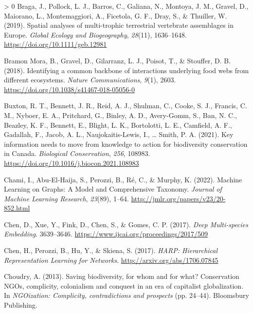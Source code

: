 \documentclass[10pt,oneside]{article}
\newlength{\cslhangindent}
\newenvironment{CSLReferences}[3] %
 {%
  \setlength{\parindent}{0pt}
  \ifodd #1 \everypar{\setlength{\hangindent}{\cslhangindent}}\ignorespaces\fi
  \ifnum #2 > 0
  \setlength{\parskip}{#2\baselineskip}
  \fi
 }%
 {}
\begin{document}
\begin{CSLReferences}{1}{0}
\leavevmode\hypertarget{ref-Braga2019SpaAna}{}%
Braga, J., Pollock, L. J., Barros, C., Galiana, N., Montoya, J. M.,
Gravel, D., Maiorano, L., Montemaggiori, A., Ficetola, G. F., Dray, S.,
\& Thuiller, W. (2019). Spatial analyses of multi-trophic terrestrial
vertebrate assemblages in Europe. \emph{Global Ecology and
Biogeography}, \emph{28}(11), 1636--1648.
\url{https://doi.org/10.1111/geb.12981}

\leavevmode\hypertarget{ref-BramonMora2018IdeCom}{}%
Bramon Mora, B., Gravel, D., Gilarranz, L. J., Poisot, T., \& Stouffer,
D. B. (2018). Identifying a common backbone of interactions underlying
food webs from different ecosystems. \emph{Nature Communications},
\emph{9}(1), 2603. \url{https://doi.org/10.1038/s41467-018-05056-0}

\leavevmode\hypertarget{ref-Buxton2021KeyInf}{}%
Buxton, R. T., Bennett, J. R., Reid, A. J., Shulman, C., Cooke, S. J.,
Francis, C. M., Nyboer, E. A., Pritchard, G., Binley, A. D., Avery-Gomm,
S., Ban, N. C., Beazley, K. F., Bennett, E., Blight, L. K., Bortolotti,
L. E., Camfield, A. F., Gadallah, F., Jacob, A. L., Naujokaitis-Lewis,
I., \ldots{} Smith, P. A. (2021). Key information needs to move from
knowledge to action for biodiversity conservation in Canada.
\emph{Biological Conservation}, \emph{256}, 108983.
\url{https://doi.org/10.1016/j.biocon.2021.108983}

\leavevmode\hypertarget{ref-Chami2022MacLea}{}%
Chami, I., Abu-El-Haija, S., Perozzi, B., Ré, C., \& Murphy, K. (2022).
Machine Learning on Graphs: A Model and Comprehensive Taxonomy.
\emph{Journal of Machine Learning Research}, \emph{23}(89), 1--64.
\url{http://jmlr.org/papers/v23/20-852.html}

\leavevmode\hypertarget{ref-Chen2017DeeMul}{}%
Chen, D., Xue, Y., Fink, D., Chen, S., \& Gomes, C. P. (2017).
\emph{Deep Multi-species Embedding}. 3639--3646.
\url{https://www.ijcai.org/proceedings/2017/509}

\leavevmode\hypertarget{ref-Chen2017HarHie}{}%
Chen, H., Perozzi, B., Hu, Y., \& Skiena, S. (2017). \emph{HARP:
Hierarchical Representation Learning for Networks}.
\url{http://arxiv.org/abs/1706.07845}

\leavevmode\hypertarget{ref-Choudry2013SavBio}{}%
Choudry, A. (2013). Saving biodiversity, for whom and for what?
Conservation NGOs, complicity, colonialism and conquest in an era of
capitalist globalization. In \emph{NGOization: Complicity,
contradictions and prospects} (pp. 24--44). Bloomsbury Publishing.


\end{CSLReferences}
\end{document}
